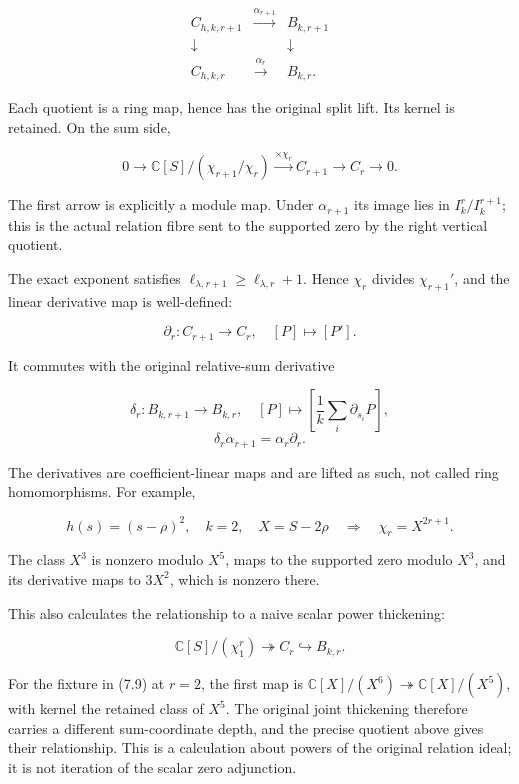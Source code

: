 \[\begin{array}{ccc}
C_{h,k,r+1}&\xrightarrow{\alpha_{r+1}}&B_{k,r+1}\\
\downarrow&&\downarrow\\
C_{h,k,r}&\xrightarrow{\alpha_r}&B_{k,r}.
\end{array}\tag{7.5}\]

Each quotient is a ring map, hence has the original split lift. Its
kernel is retained. On the sum side,

\[0\to \mathbb C[S]/(\chi_{r+1}/\chi_r)
\xrightarrow{\times\chi_r}C_{r+1}\to C_r\to0.\tag{7.6}\]

The first arrow is explicitly a module map. Under \(\alpha_{r+1}\) its
image lies in \(I_k^r/I_k^{r+1}\); this is the actual relation fibre
sent to the supported zero by the right vertical quotient.

The exact exponent satisfies
\(\ell_{\lambda,r+1}\ge\ell_{\lambda,r}+1\). Hence \(\chi_r\) divides
\(\chi_{r+1}'\), and the linear derivative map is well-defined:

\[\boxed{\partial_r:C_{r+1}\to C_r,\quad[P]\mapsto[P'].}\tag{7.7}\]

It commutes with the original relative-sum derivative

\[\delta_r:B_{k,r+1}\to B_{k,r},\quad
[P]\mapsto\left[\frac1k\sum_i\partial_{s_i}P\right],\]
\[\boxed{\delta_r\alpha_{r+1}=\alpha_r\partial_r.}\tag{7.8}\]

The derivatives are coefficient-linear maps and are lifted as such, not
called ring homomorphisms. For example,

\[h(s)=(s-\rho)^2,\quad k=2,\quad X=S-2\rho
\quad\Longrightarrow\quad\chi_r=X^{2r+1}.\tag{7.9}\]

The class \(X^3\) is nonzero modulo \(X^5\), maps to the supported zero
modulo \(X^3\), and its derivative maps to \(3X^2\), which is nonzero
there.

This also calculates the relationship to a naive scalar power
thickening:

\[\mathbb C[S]/(\chi_1^r)\twoheadrightarrow C_r\hookrightarrow B_{k,r}.\tag{7.10}\]

For the fixture in (7.9) at \(r=2\), the first map is
\(\mathbb C[X]/(X^6)\twoheadrightarrow\mathbb C[X]/(X^5)\), with kernel
the retained class of \(X^5\). The original joint thickening therefore
carries a different sum-coordinate depth, and the precise quotient above
gives their relationship. This is a calculation about powers of the
original relation ideal; it is not iteration of the scalar zero
adjunction.

